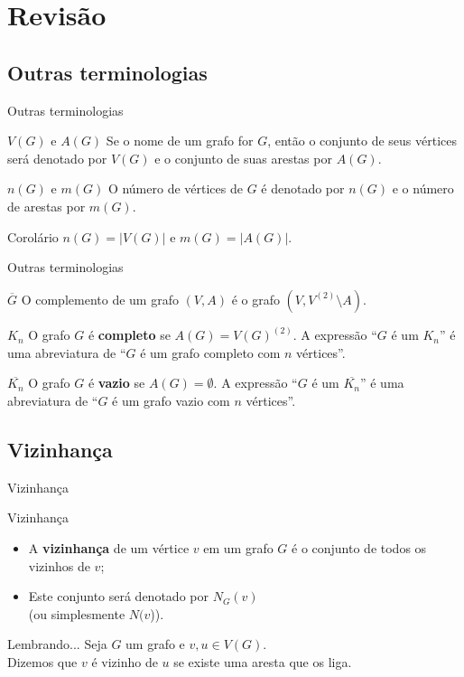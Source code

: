 \documentclass[xcolor=dvipsnames,table]{beamer}
\begin{document}
    \section{Revisão}
	\subsection{Outras terminologias}
	\begin{frame}{Outras terminologias}
		\begin{block}{$V(G)$ e $A(G)$}
			Se o nome de um grafo for $G$, então o conjunto de seus vértices será denotado por $V(G)$ e o conjunto de suas arestas por $A(G)$.
		\end{block}
		\begin{block}{$n(G)$ e $m(G)$}
			O número de vértices de $G$ é denotado por $n(G)$ e o número de arestas por $m(G)$. 
		\end{block}
		\begin{block}{Corolário}
			$n(G) = |V(G)|$ e $m(G) = |A(G)|$.
		\end{block}
	\end{frame}
	
	\begin{frame}{Outras terminologias}
		\begin{block}{$\overline{G}$}
			O complemento de um grafo $(V, A)$ é o grafo $(V, V^{(2)} \setminus A)$.
		\end{block}
		\begin{block}{$K_n$} 
			O grafo $G$ é {\bf completo} se $A(G) = V(G)^{(2)}$. A expressão ``$G$ é um $K_n$'' é uma abreviatura de ``$G$ é um grafo completo com $n$ vértices''.
		\end{block}
		\begin{block}{$\overline{K_n}$} 
			O grafo $G$ é {\bf vazio} se $A(G) =\emptyset$. A expressão ``$G$ é um $\overline{K_n}$'' é uma abreviatura de ``$G$ é um grafo vazio com $n$ vértices''.
		\end{block}
	\end{frame}
    
    \subsection{Vizinhança}
	\begin{frame}{Vizinhança}
		\begin{block}{Vizinhança}
			\begin{itemize}
				\item A {\bf vizinhança} de um vértice $v$ em um grafo $G$ é o conjunto de todos os vizinhos de $v$;
				\item Este conjunto será denotado por $N_G(v)$ \\(ou simplesmente $N(v$)).
			\end{itemize}
		\end{block}
		\begin{exampleblock}{Lembrando...}
			Seja $G$ um grafo e $v, u \in V(G)$. \\Dizemos que $v$ é vizinho de $u$ se existe uma aresta que os liga.
		\end{exampleblock}
	\end{frame}
	
\end{document}
